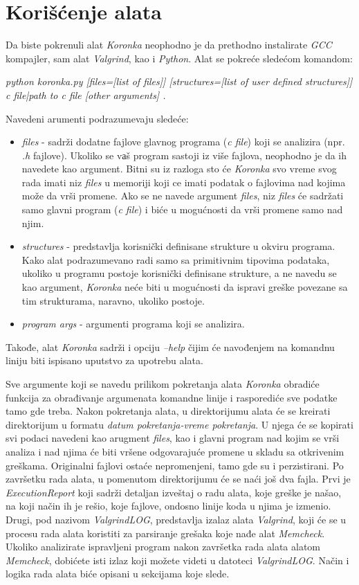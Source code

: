 \documentclass[12pt,oneside]{memoir}
\theoremstyle{plain}
\theoremstyle{definition}
\begin{document}
\section{Korišćenje alata}
Da biste pokrenuli alat \textit{Koronka} neophodno je da prethodno instalirate \textit{GCC} kompajler, sam alat \textit{Valgrind}, kao i \textit{Python}. Alat se pokreće sledećom komandom:
\begin{center}
\textit{python koronka.py [files=[list of files]] [structures=[list of user defined structures]] c file|path to c file [other arguments] .}
\end{center}
Navedeni arumenti podrazumevaju sledeće:
\begin{itemize}
\item \textit{files} - sadrži dodatne fajlove glavnog programa (\textit{c file}) koji se analizira (npr. \textit{.h} fajlove). Ukoliko se vаš program sastoji iz više fajlova, neophodno je da ih navedete kao argument. Bitni su iz razloga sto će \textit{Koronka} svo vreme svog rada imati niz \textit{files} u memoriji koji ce imati podatak o fajlovima nad kojima može da vrši promene. Ako se ne navede argument \textit{files}, niz \textit{files} će sadržati samo glavni program (\textit{c file}) i biće u mogućnosti da vrši promene samo nad njim.
\item \textit{structures} - predstavlja korisnički definisane strukture u okviru programa. Kako alat podrazumevano radi samo sa primitivnim tipovima podataka, ukoliko u programu postoje korisnički definisane strukture, a ne navedu se kao argument, \textit{Koronka} neće biti u mogućnosti da ispravi greške povezane sa tim strukturama, naravno, ukoliko postoje.
\item \textit{program args} - argumenti programa koji se analizira.
\end{itemize}

Takođe, alat \textit{Koronka} sadrži i opciju \textit{--help } čijim će navođenjem na komandnu liniju biti ispisano uputstvo za upotrebu alata. 

Sve argumente koji se navedu prilikom pokretanja alata \textit{Koronka} obradiće funkcija za obrađivanje argumenata komandne linije i rasporediće sve podatke tamo gde treba. Nakon pokretanja alata, u direktorijumu alata će se kreirati direktorijum u formatu \textit{datum pokretanja-vreme pokretanja}. U njega će se kopirati svi podaci navedeni kao arugment \textit{files}, kao i glavni program nad kojim se vrši analiza i nad njima će biti vršene odgovarajuće promene u skladu sa otkrivenim greškama. Originalni fajlovi ostaće nepromenjeni, tamo gde su i perzistirani. Po završetku rada alata, u pomenutom direktorijumu će se naći još dva fajla. Prvi je \textit{ExecutionReport} koji sadrži detaljan izveštaj o radu alata, koje greške je našao, na koji način ih je rešio, koje fajlove, ondosno linije koda u njima je izmenio. Drugi, pod nazivom \textit{ValgrindLOG}, predstavlja izalaz alata \textit{Valgrind}, koji će se u procesu rada alata koristiti za parsiranje grešaka koje nađe alat \textit{Memcheck}. Ukoliko analizirate ispravljeni program nakon završetka rada alata alatom \textit{Memcheck}, dobićete isti izlaz koji možete videti u datoteci \textit{ValgrindLOG}. Način i logika rada alata biće opisani u sekcijama koje slede.
\end{document}
